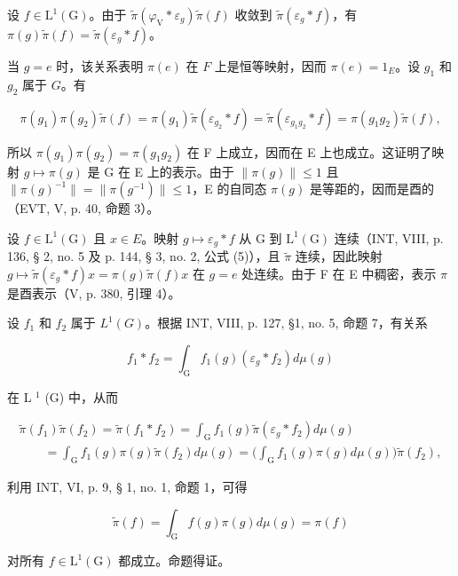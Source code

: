 设 \(f \in \mathrm{L}^1(\mathrm{G})\)。由于 \(\widetilde{\pi}(\varphi_{\mathrm{V}} * \varepsilon_g) \widetilde{\pi}(f)\) 收敛到 \(\widetilde{\pi}(\varepsilon_g * f)\)，有 \(\pi(g) \widetilde{\pi}(f) = \widetilde{\pi}(\varepsilon_g * f)\)。

当 \(g = e\) 时，该关系表明 \(\pi(e)\) 在 \(F\) 上是恒等映射，因而 \(\pi(e) = 1_{E}\)。设 \(g_1\) 和 \(g_2\) 属于 \(G\)。有

\[
\pi (g _ {1}) \pi (g _ {2}) \widetilde {\pi} (f) = \pi (g _ {1}) \widetilde {\pi} (\varepsilon_ {g _ {2}} * f) = \widetilde {\pi} (\varepsilon_ {g _ {1} g _ {2}} * f) = \pi (g _ {1} g _ {2}) \widetilde {\pi} (f),
\]

所以 \(\pi(g_1)\pi(g_2) = \pi(g_1g_2)\) 在 F 上成立，因而在 E 上也成立。这证明了映射 \(g \mapsto \pi(g)\) 是 G 在 E 上的表示。由于 \(\|\pi(g)\| \leqslant 1\) 且 \(\|\pi(g)^{-1}\| = \|\pi(g^{-1})\| \leqslant 1\)，E 的自同态 \(\pi(g)\) 是等距的，因而是酉的（EVT, V, p. 40, 命题 3）。

设 \(f \in \mathrm{L}^{1}(\mathrm{G})\) 且 \(x \in E\)。映射 \(g \mapsto \varepsilon_{g} * f\) 从 G 到 \(\mathrm{L}^{1}(\mathrm{G})\) 连续（INT, VIII, p. 136, § 2, no. 5 及 p. 144, § 3, no. 2, 公式 (5)），且 \(\widetilde{\pi}\) 连续，因此映射 \(g \mapsto \widetilde{\pi}(\varepsilon_{g} * f)x = \pi(g)\widetilde{\pi}(f)x\) 在 \(g = e\) 处连续。由于 F 在 E 中稠密，表示 \(\pi\) 是酉表示（V, p. 380, 引理 4）。

设 \(f_1\) 和 \(f_2\) 属于 \(L^1(G)\)。根据 INT, VIII, p. 127, §1, no. 5, 命题 7，有关系

\[
f _ {1} * f _ {2} = \int_ {\mathrm{G}} f _ {1} (g) (\varepsilon_ {g} * f _ {2}) d \mu (g)
\]

在 L \(^{1}\) (G) 中，从而

\[
\begin{array}{l} \widetilde {\pi} (f _ {1}) \widetilde {\pi} (f _ {2}) = \widetilde {\pi} (f _ {1} * f _ {2}) = \int_ {\mathrm{G}} f _ {1} (g) \widetilde {\pi} (\varepsilon_ {g} * f _ {2}) d \mu (g) \\ \qquad = \int_ {\mathrm{G}} f _ {1} (g) \pi (g) \widetilde {\pi} (f _ {2}) d \mu (g) = \Big (\int_ {\mathrm{G}} f _ {1} (g) \pi (g) d \mu (g) \Big) \widetilde {\pi} (f _ {2}), \end{array}
\]

利用 INT, VI, p. 9, § 1, no. 1, 命题 1，可得

\[
\widetilde {\pi} (f) = \int_ {\mathrm{G}} f (g) \pi (g) d \mu (g) = \pi (f)
\]

对所有 \(f \in \mathrm{L}^{1}(\mathrm{G})\) 都成立。命题得证。

